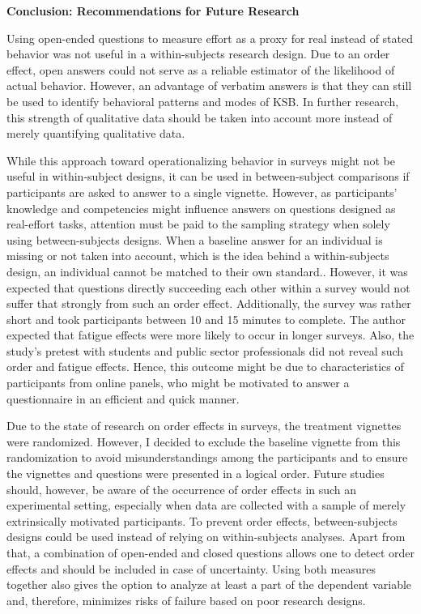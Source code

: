 \documentclass{article}
\begin{document}
\textbf{}

\textbf{Conclusion: Recommendations for Future Research}

Using open-ended questions to measure effort as a proxy for real instead of stated behavior was not useful in a within-subjects research design. Due to an order effect, open answers could not serve as a reliable estimator of the likelihood of actual behavior. However, an advantage of verbatim answers is that they can still be used to identify behavioral patterns and modes of KSB. In further research, this strength of qualitative data should be taken into account more instead of merely quantifying qualitative data.

While this approach toward operationalizing behavior in surveys might not be useful in within-subject designs, it can be used in between-subject comparisons if participants are asked to answer to a single vignette. However, as participants' knowledge and competencies might influence answers on questions designed as real-effort tasks, attention must be paid to the sampling strategy when solely using between-subjects designs. When a baseline answer for an individual is missing or not taken into account, which is the idea behind a within-subjects design, an individual cannot be matched to their own standard.\parencite{Galesic2009}. However, it was expected that questions directly succeeding each other within a survey would not suffer that strongly from such an order effect. Additionally, the survey was rather short and took participants between 10 and 15 minutes to complete. The author expected that fatigue effects were more likely to occur in longer surveys. Also, the study's pretest with students and public sector professionals did not reveal such order and fatigue effects. Hence, this outcome might be due to characteristics of participants from online panels, who might be motivated to answer a questionnaire in an efficient and quick manner. 

Due to the state of research on order effects in surveys, the treatment vignettes were randomized. However, I decided to exclude the baseline vignette from this randomization to avoid misunderstandings among the participants and to ensure the vignettes and questions were presented in a logical order. Future studies should, however, be aware of the occurrence of order effects in such an experimental setting, especially when data are collected with a sample of merely extrinsically motivated participants. To prevent order effects, between-subjects designs could be used instead of relying on within-subjects analyses. Apart from that, a combination of open-ended and closed questions allows one to detect order effects and should be included in case of uncertainty. Using both measures together also gives the option to analyze at least a part of the dependent variable and, therefore, minimizes risks of failure based on poor research designs. 
\end{document}
